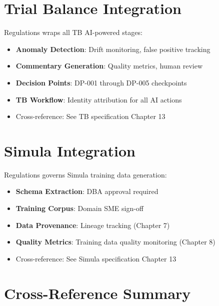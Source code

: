 \section{Trial Balance Integration}
\label{sec:tb-integration}

Regulations wraps all TB AI-powered stages:

\begin{itemize}
  \item \textbf{Anomaly Detection}: Drift monitoring, false positive tracking
  \item \textbf{Commentary Generation}: Quality metrics, human review
  \item \textbf{Decision Points}: DP-001 through DP-005 checkpoints
  \item \textbf{TB Workflow}: Identity attribution for all AI actions
  \item Cross-reference: See TB specification Chapter 13
\end{itemize}

\section{Simula Integration}
\label{sec:simula-integration}

Regulations governs Simula training data generation:

\begin{itemize}
  \item \textbf{Schema Extraction}: DBA approval required
  \item \textbf{Training Corpus}: Domain SME sign-off
  \item \textbf{Data Provenance}: Lineage tracking (Chapter 7)
  \item \textbf{Quality Metrics}: Training data quality monitoring (Chapter 8)
  \item Cross-reference: See Simula specification Chapter 13
\end{itemize}

\section{Cross-Reference Summary}
\label{sec:xref-summary}

